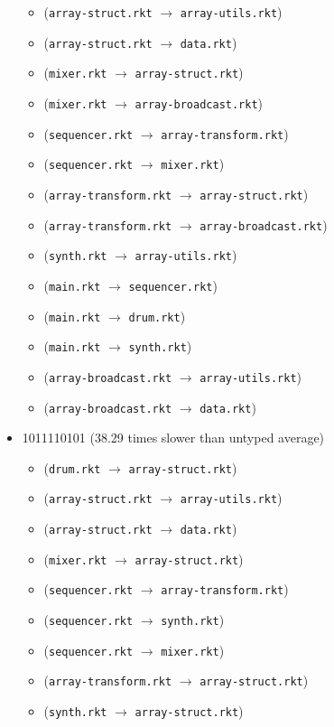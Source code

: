 \documentclass{article}
\newcommand{\mono}[1]{\texttt{#1}}
\begin{document}
\begin{itemize}
\begin{itemize}
  \item (\mono{array-struct.rkt} $\rightarrow$ \mono{array-utils.rkt})
  \item (\mono{array-struct.rkt} $\rightarrow$ \mono{data.rkt})
  \item (\mono{mixer.rkt} $\rightarrow$ \mono{array-struct.rkt})
  \item (\mono{mixer.rkt} $\rightarrow$ \mono{array-broadcast.rkt})
  \item (\mono{sequencer.rkt} $\rightarrow$ \mono{array-transform.rkt})
  \item (\mono{sequencer.rkt} $\rightarrow$ \mono{mixer.rkt})
  \item (\mono{array-transform.rkt} $\rightarrow$ \mono{array-struct.rkt})
  \item (\mono{array-transform.rkt} $\rightarrow$ \mono{array-broadcast.rkt})
  \item (\mono{synth.rkt} $\rightarrow$ \mono{array-utils.rkt})
  \item (\mono{main.rkt} $\rightarrow$ \mono{sequencer.rkt})
  \item (\mono{main.rkt} $\rightarrow$ \mono{drum.rkt})
  \item (\mono{main.rkt} $\rightarrow$ \mono{synth.rkt})
  \item (\mono{array-broadcast.rkt} $\rightarrow$ \mono{array-utils.rkt})
  \item (\mono{array-broadcast.rkt} $\rightarrow$ \mono{data.rkt})
  \end{itemize}
\item 1011110101 (38.29 times slower than untyped average)
  \begin{itemize}
  \item (\mono{drum.rkt} $\rightarrow$ \mono{array-struct.rkt})
  \item (\mono{array-struct.rkt} $\rightarrow$ \mono{array-utils.rkt})
  \item (\mono{array-struct.rkt} $\rightarrow$ \mono{data.rkt})
  \item (\mono{mixer.rkt} $\rightarrow$ \mono{array-struct.rkt})
  \item (\mono{sequencer.rkt} $\rightarrow$ \mono{array-transform.rkt})
  \item (\mono{sequencer.rkt} $\rightarrow$ \mono{synth.rkt})
  \item (\mono{sequencer.rkt} $\rightarrow$ \mono{mixer.rkt})
  \item (\mono{array-transform.rkt} $\rightarrow$ \mono{array-struct.rkt})
  \item (\mono{synth.rkt} $\rightarrow$ \mono{array-struct.rkt})

\end{itemize}
\end{itemize}
\end{document}
